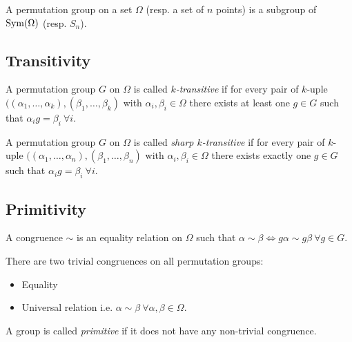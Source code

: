 \begin{definition}
  A permutation group on a set $\Omega$ (resp. a set of $n$ points) is a subgroup of $\operatorname{Sym}(\Omega)$ (resp. $S_n$).
\end{definition}

\subsection{Transitivity}

\begin{definition}
  A permutation group $G$ on $\Omega$ is called \textit{$k$-transitive} if for every pair of $k$-uple $((\alpha_1, \dots, \alpha_k), (\beta_1, \dots, \beta_k)$ with $\alpha_i, \beta_i \in \Omega$ there exists at least one $g \in G$ such that $\alpha_i g = \beta_i \  \forall i$.
\end{definition}

\begin{definition}
  A permutation group $G$ on $\Omega$ is called \textit{sharp $k$-transitive} if for every pair of $k$-uple $((\alpha_1, \dots, \alpha_n), (\beta_1, \dots, \beta_n)$ with $\alpha_i, \beta_i \in \Omega$ there exists exactly one $g \in G$ such that $\alpha_i g = \beta_i \  \forall i$.
\end{definition}

\subsection{Primitivity}

\begin{definition}[Congruence]
  A congruence $\sim$ is an equality relation on $\Omega$ such that $\alpha \sim \beta \Leftrightarrow g\alpha \sim g\beta \ \forall g \in G$.
\end{definition}

There are two trivial congruences on all permutation groups:
\begin{itemize}
  \item Equality
  \item Universal relation i.e. $\alpha \sim \beta \ \forall \alpha, \beta \in \Omega$.
\end{itemize}

\begin{definition}
  A group is called \textit{primitive} if it does not have any non-trivial congruence.
\end{definition}

